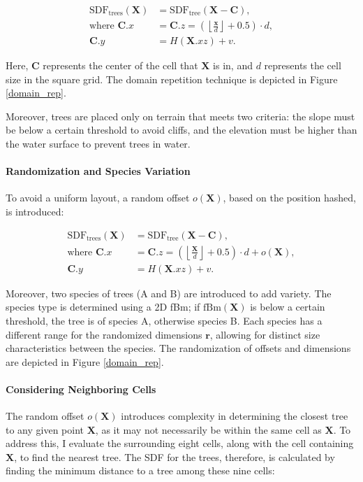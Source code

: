 \begin{equation}
\begin{aligned}
\text{SDF}_\text{trees}(\mathbf{X}) &= \text{SDF}_\text{tree}(\mathbf{X} - \mathbf{C}), \\
\text{where } \mathbf{C}.x &= \mathbf{C}.z = \left(\left\lfloor \frac{\mathbf{x}}{d} \right\rfloor + 0.5\right) \cdot d, \\
\mathbf{C}.y &= H(\mathbf{X}.{xz}) + v.
\end{aligned}
\end{equation}

Here, $\mathbf{C}$ represents the center of the cell that $\mathbf{X}$ is in, and $d$ represents the cell size in the square grid. The domain repetition technique is depicted in Figure \ref{domain_rep}.

Moreover, trees are placed only on terrain that meets two criteria: the slope must be below a certain threshold to avoid cliffs, and the elevation must be higher than the water surface to prevent trees in water.

\paragraph{Randomization and Species Variation}
To avoid a uniform layout, a random offset $o(\mathbf{X})$, based on the position hashed, is introduced:

\begin{equation}
\begin{aligned}
\text{SDF}_\text{trees}(\mathbf{X}) &= \text{SDF}_\text{tree}(\mathbf{X} - \mathbf{C}), \\
\text{where } \mathbf{C}.x &= \mathbf{C}.z = \left(\left\lfloor \frac{\mathbf{X}}{d} \right\rfloor + 0.5\right) \cdot d + o(\mathbf{X}), \\
\mathbf{C}.y &= H(\mathbf{X}.{xz}) + v.
\end{aligned}
\end{equation}

Moreover, two species of trees (A and B) are introduced to add variety. The species type is determined using a 2D fBm; if $\text{fBm}(\mathbf{X})$ is below a certain threshold, the tree is of species A, otherwise species B. Each species has a different range for the randomized dimensions $\mathbf{r}$, allowing for distinct size characteristics between the species. The randomization of offsets and dimensions are depicted in Figure \ref{domain_rep}.

\paragraph{Considering Neighboring Cells}
The random offset $o(\mathbf{X})$ introduces complexity in determining the closest tree to any given point $\mathbf{X}$, as it may not necessarily be within the same cell as $\mathbf{X}$. To address this, I evaluate the surrounding eight cells, along with the cell containing $\mathbf{X}$, to find the nearest tree. The SDF for the trees, therefore, is calculated by finding the minimum distance to a tree among these nine cells:

